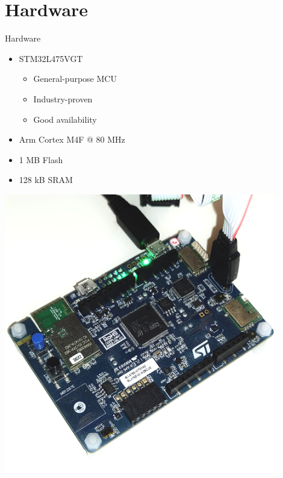 \documentclass{beamer}
\begin{document}
\section{Hardware}
\begin{frame}{Hardware}
\begin{minipage}{0.5\textwidth}
	\begin{itemize}
		\item<2->STM32L475VGT
			\begin{itemize}
				\item<3-> General-purpose MCU
				\item<4-> Industry-proven
				\item<5-> Good availability
			\end{itemize}
		\item<6->Arm Cortex M4F @ 80 MHz
		\item<7->1 MB Flash
		\item<8->128 kB SRAM
	\end{itemize}
	\end{minipage}
	\begin{minipage}{0.48\textwidth}
		\includegraphics[width=0.9\textwidth]{figures/stm32_eval.jpg}
	\end{minipage}
\end{frame}
\end{document}
